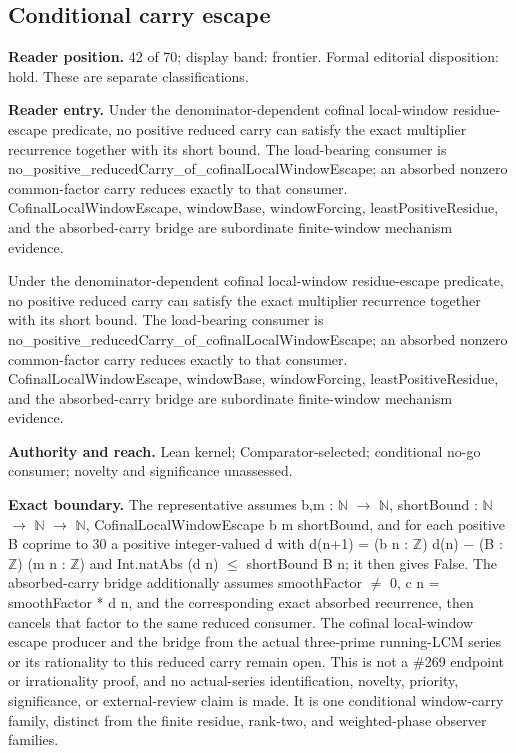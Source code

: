 \documentclass[11pt]{article}
\begin{document}
\subsection{Conditional carry escape}
\textbf{Reader position.} 42 of 70; display band: frontier.  Formal editorial disposition: hold.  These are separate classifications.

\textbf{Reader entry.} Under the denominator-dependent cofinal local-window residue-escape predicate, no positive reduced carry can satisfy the exact multiplier recurrence together with its short bound. The load-bearing consumer is no\_positive\_reducedCarry\_of\_cofinalLocalWindowEscape; an absorbed nonzero common-factor carry reduces exactly to that consumer. CofinalLocalWindowEscape, windowBase, windowForcing, leastPositiveResidue, and the absorbed-carry bridge are subordinate finite-window mechanism evidence.

Under the denominator-dependent cofinal local-window residue-escape predicate, no positive reduced carry can satisfy the exact multiplier recurrence together with its short bound. The load-bearing consumer is no\_positive\_reducedCarry\_of\_cofinalLocalWindowEscape; an absorbed nonzero common-factor carry reduces exactly to that consumer. CofinalLocalWindowEscape, windowBase, windowForcing, leastPositiveResidue, and the absorbed-carry bridge are subordinate finite-window mechanism evidence.

\textbf{Authority and reach.} Lean kernel; Comparator-selected; conditional no-go consumer; novelty and significance unassessed.

\textbf{Exact boundary.} The representative assumes b,m : \ensuremath{\mathbb{N}} \ensuremath{\to} \ensuremath{\mathbb{N}}, shortBound : \ensuremath{\mathbb{N}} \ensuremath{\to} \ensuremath{\mathbb{N}} \ensuremath{\to} \ensuremath{\mathbb{N}}, CofinalLocalWindowEscape b m shortBound, and for each positive B coprime to 30 a positive integer-valued d with d(n+1) = (b n : \ensuremath{\mathbb{Z}}) d(n) \ensuremath{-} (B : \ensuremath{\mathbb{Z}}) (m n : \ensuremath{\mathbb{Z}}) and Int.natAbs (d n) \ensuremath{\le} shortBound B n; it then gives False. The absorbed-carry bridge additionally assumes smoothFactor \ensuremath{\ne} 0, c n = smoothFactor * d n, and the corresponding exact absorbed recurrence, then cancels that factor to the same reduced consumer. The cofinal local-window escape producer and the bridge from the actual three-prime running-LCM series or its rationality to this reduced carry remain open. This is not a \#269 endpoint or irrationality proof, and no actual-series identification, novelty, priority, significance, or external-review claim is made. It is one conditional window-carry family, distinct from the finite residue, rank-two, and weighted-phase observer families.
\end{document}
